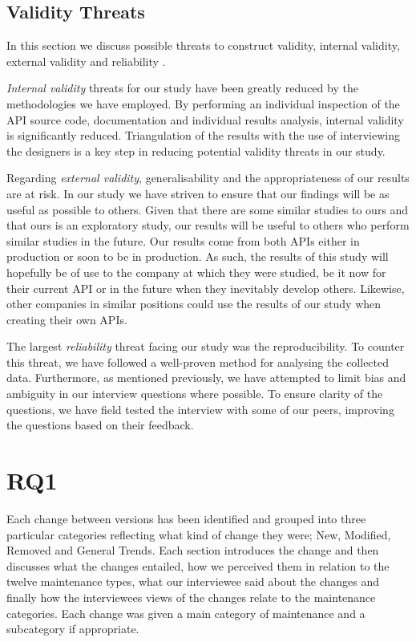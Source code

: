 \documentclass{sig-alternate}
\begin{document}
\subsection{Validity Threats} \label{validity_threats}
In this section we discuss possible threats to construct validity, internal validity, external validity and reliability \cite{runeson2009guidelines}.


\textit{Internal validity} threats for our study have been greatly reduced by the methodologies we have employed. By performing an individual inspection of  the API source code, documentation and individual results analysis, internal validity is significantly reduced. Triangulation of the results with the use of interviewing the designers is a key step in reducing potential validity threats in our study.

Regarding \textit{external validity}, generalisability and the appropriateness of our results are at risk. In our study we have striven to ensure that our findings will be as useful as possible to others. Given that there are some similar studies to ours and that ours is an exploratory study, our results will be useful to others who perform similar studies in the future. Our results come from both APIs either in production or soon to be in production. As such, the results of this study will hopefully be of use to the company at which they were studied, be it now for their current API or in the future when they inevitably develop others. Likewise, other companies in similar positions could use the results of our study when creating their own APIs.

The largest \textit{reliability} threat facing our study was the reproducibility. To counter this threat, we have followed a well-proven method for analysing the collected data. Furthermore, as mentioned previously, we have attempted to limit bias and ambiguity in our interview questions where possible. To ensure clarity of the questions, we have field tested the interview with some of our peers, improving the questions based on their feedback.


 \newpage
\section{RQ1} \label{results}

Each change between versions has been identified and grouped into three particular categories reflecting what kind of change they were; New, Modified, Removed and General Trends. Each section introduces the change and then discusses what the changes entailed, how we perceived them in relation to the twelve maintenance types, what our interviewee said about the changes and finally how the interviewees views of the changes relate to the maintenance categories. Each change was given a main category of maintenance and a subcategory if appropriate.
\end{document}
